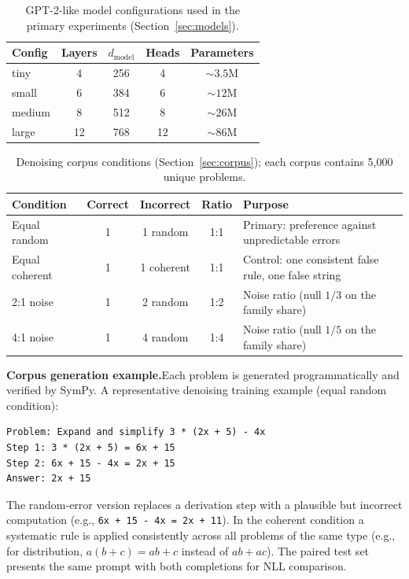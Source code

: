 \documentclass{article}
\begin{document}
\begin{table}[ht]
\centering\small
\begin{tabular}{lcccc}
\toprule
Config & Layers & $d_{\text{model}}$ & Heads & Parameters \\
\midrule
tiny   & 4  & 256 & 4  & ${\sim}3.5$M \\
small  & 6  & 384 & 6  & ${\sim}12$M \\
medium & 8  & 512 & 8  & ${\sim}26$M \\
large  & 12 & 768 & 12 & ${\sim}86$M \\
\bottomrule
\end{tabular}
\caption{GPT-2-like model configurations used in the primary experiments (Section~\ref{sec:models}).}
\label{tab:models}
\end{table}

\begin{table}[ht]
\centering\small
\begin{tabular}{lccc>{\raggedright\arraybackslash}p{5cm}}
\toprule
Condition & Correct & Incorrect & Ratio & Purpose \\
\midrule
Equal random   & 1 & 1 random   & 1:1 & Primary: preference against unpredictable errors \\
Equal coherent & 1 & 1 coherent & 1:1 & Control: one consistent false rule, one false string \\
2:1 noise      & 1 & 2 random   & 1:2 & Noise ratio (null $1/3$ on the family share) \\
4:1 noise      & 1 & 4 random   & 1:4 & Noise ratio (null $1/5$ on the family share) \\
\bottomrule
\end{tabular}
\caption{Denoising corpus conditions (Section~\ref{sec:corpus}); each corpus contains 5{,}000 unique problems.}
\label{tab:conditions}
\end{table}

\textbf{Corpus generation example.}\quad Each problem is generated programmatically and verified by SymPy. A representative denoising training example (equal random condition):

\begin{verbatim}
Problem: Expand and simplify 3 * (2x + 5) - 4x
Step 1: 3 * (2x + 5) = 6x + 15
Step 2: 6x + 15 - 4x = 2x + 15
Answer: 2x + 15
\end{verbatim}

The random-error version replaces a derivation step with a plausible but incorrect computation (e.g., \texttt{6x + 15 - 4x = 2x + 11}). In the coherent condition a systematic rule is applied consistently across all problems of the same type (e.g., for distribution, $a(b+c) = ab + c$ instead of $ab + ac$). The paired test set presents the same prompt with both completions for NLL comparison.
\end{document}
